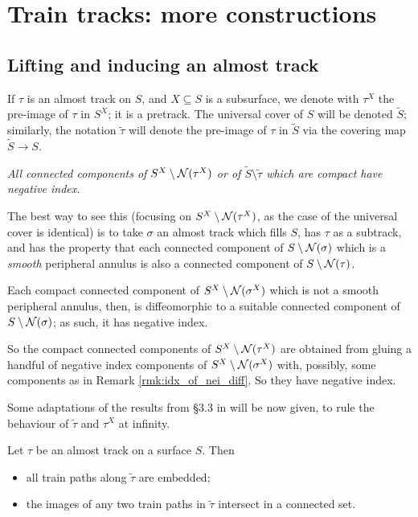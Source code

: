 \section{Train tracks: more constructions}\label{sec:traintracksmore}
\subsection{Lifting and inducing an almost track}\label{sub:induced}

If $\tau$ is an almost track on $S$, and $X\subseteq S$ is a subsurface, we denote with $\tau^X$ the pre-image of $\tau$ in $S^X$; it is a pretrack. The universal cover of $S$ will be denoted $\tilde S$; similarly, the notation $\tilde\tau$ will denote the pre-image of $\tau$ in $\tilde S$ via the covering map $\tilde S\rightarrow S$.

\begin{rmk}\label{rmk:negativeindexincover}
\textit{All connected components of $S^X\setminus {\mathcal N}(\tau^X)$ or of $\tilde S\setminus\tilde\tau$ which are compact have negative index.}

The best way to see this (focusing on $S^X\setminus {\mathcal N}(\tau^X)$, as the case of the universal cover is identical) is to take $\sigma$ an almost track which fills $S$, has $\tau$ as a subtrack, and has the property that each connected component of $S\setminus {\mathcal N}(\sigma)$ which is a \emph{smooth} peripheral annulus is also a connected component of $S\setminus {\mathcal N}(\tau)$.

Each compact connected component of $S^X\setminus {\mathcal N}(\sigma^X)$ which is not a smooth peripheral annulus, then, is diffeomorphic to a suitable connected component of $S\setminus {\mathcal N}(\sigma)$; as such, it has negative index.

So the compact connected components of $S^X\setminus {\mathcal N}(\tau^X)$ are obtained from gluing a handful of negative index components of $S^X\setminus {\mathcal N}(\sigma^X)$ with, possibly, some components as in Remark \ref{rmk:idx_of_nei_diff}. So they have negative index.
\end{rmk}

Some adaptations of the results from \S 3.3 in \cite{mosher} will be now given, to rule the behaviour of $\tilde\tau$ and $\tau^X$ at infinity.

\begin{prop}\label{prp:paths_in_univ_cover}
Let $\tau$ be an almost track on a surface $S$. Then
\begin{itemize}
\item all train paths along $\tilde\tau$ are embedded;
\item the images of any two train paths in $\tilde\tau$ intersect in a connected set.
\end{itemize}
\end{prop}

